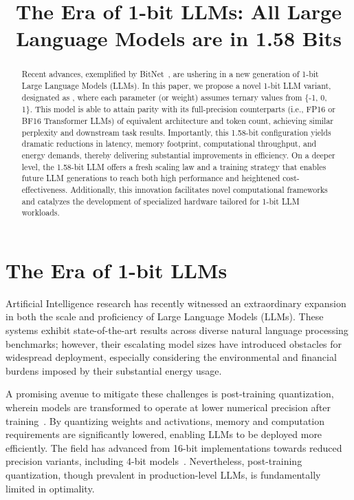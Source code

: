 \title{The Era of 1-bit LLMs: All Large Language Models are in 1.58 Bits}

\begin{abstract}
Recent advances, exemplified by BitNet~\cite{bitnet}, are ushering in a new generation of 1-bit Large Language Models (LLMs). In this paper, we propose a novel 1-bit LLM variant, designated as \textbf{}, where each parameter (or weight) assumes ternary values from \{-1, 0, 1\}. This model is able to attain parity with its full-precision counterparts (i.e., FP16 or BF16 Transformer LLMs) of equivalent architecture and token count, achieving similar perplexity and downstream task results. Importantly, this 1.58-bit configuration yields dramatic reductions in latency, memory footprint, computational throughput, and energy demands, thereby delivering substantial improvements in efficiency. On a deeper level, the 1.58-bit LLM offers a fresh scaling law and a training strategy that enables future LLM generations to reach both high performance and heightened cost-effectiveness. Additionally, this innovation facilitates novel computational frameworks and catalyzes the development of specialized hardware tailored for 1-bit LLM workloads.
\end{abstract}

\section{The Era of 1-bit LLMs}

Artificial Intelligence research has recently witnessed an extraordinary expansion in both the scale and proficiency of Large Language Models (LLMs). These systems exhibit state-of-the-art results across diverse natural language processing benchmarks; however, their escalating model sizes have introduced obstacles for widespread deployment, especially considering the environmental and financial burdens imposed by their substantial energy usage.

A promising avenue to mitigate these challenges is post-training quantization, wherein models are transformed to operate at lower numerical precision after training~\cite{smoothquant, gptq, quip, quip_sharp}. By quantizing weights and activations, memory and computation requirements are significantly lowered, enabling LLMs to be deployed more efficiently. The field has advanced from 16-bit implementations towards reduced precision variants, including 4-bit models~\cite{gptq, awq}. Nevertheless, post-training quantization, though prevalent in production-level LLMs, is fundamentally limited in optimality.


